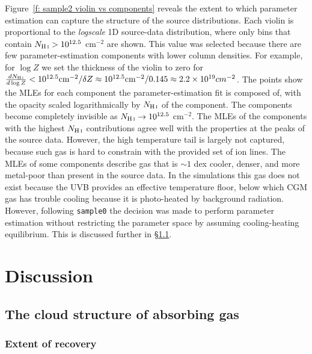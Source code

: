 \documentclass[fleqn,usenatbib]{mnras}
\begin{document}
Figure~\ref{f: sample2 violin vs components} reveals the extent to which parameter estimation can capture the structure of the source distributions.
Each violin is proportional to the \textit{logscale} 1D source-data distribution,
where only bins that contain $N_{\ion{H}{I}} > 10^{12.5}$ cm$^{-2}$ are shown.
This value was selected because there are few parameter-estimation components with lower column densities.
For example, for $\log Z$ we set the thickness of the violin to zero for $\frac{dN_{\ion{H}{I}}}{d\log Z} < 10^{12.5} {\rm cm}^{-2} / \delta Z \approx 10^{12.5} {\rm cm}^{-2} / 0.145 \approx 2.2 \times 10^{19} cm^{-2} $.
The points show the MLEs for each component the parameter-estimation fit is composed of,
with the opacity scaled logarithmically by $N_{\ion{H}{I}}$ of the component.
The components become completely invisible as $N_{\ion{H}{I}} \rightarrow 10^{12.5}$ cm$^{-2}$.
The MLEs of the components with the highest $N_{\ion{H}{I}}$ contributions agree well with the properties at the peaks of the source data.
However, the high temperature tail is largely not captured, because such gas is hard to constrain with the provided set of ion lines.
The MLEs of some components describe gas that is $\sim 1$ dex cooler, denser, and more metal-poor than present in the source data.
In the simulations this gas does not exist because the UVB provides an effective temperature floor,
below which CGM gas has trouble cooling because it is photo-heated by background radiation.
However, following \texttt{sample0} the decision was made to perform parameter estimation without restricting the parameter space by assuming cooling-heating equilibrium.
This is discussed further in \S\ref{s: discussion -- cloud structure}.

\section{Discussion}
\label{s: discussion}

\subsection{The cloud structure of absorbing gas}
\label{s: discussion -- cloud structure}

\subsubsection{Extent of recovery}
\label{s: discussion -- cloud structure -- recovery}
\end{document}

